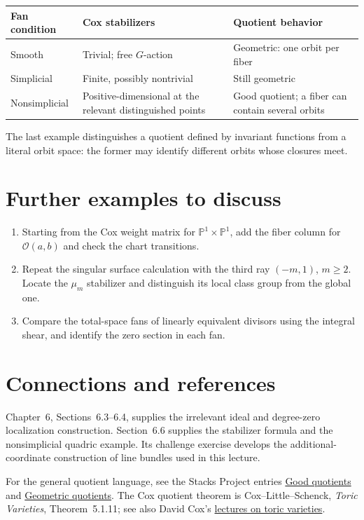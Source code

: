 \documentclass[11pt]{article}
\theoremstyle{definition}
\theoremstyle{remark}
\newcommand{\Pj}{\mathbb P}
\newcommand{\OO}{\mathcal O}
\begin{document}
\begin{center}
\small
\begin{tabularx}{\linewidth}{@{}lXX@{}}
\toprule
Fan condition & Cox stabilizers & Quotient behavior\\
\midrule
Smooth & Trivial; free \(G\)-action & Geometric: one orbit per fiber\\
Simplicial & Finite, possibly nontrivial & Still geometric\\
Nonsimplicial & Positive-dimensional at the relevant distinguished points
& Good quotient; a fiber can contain several orbits\\
\bottomrule
\end{tabularx}
\end{center}
The last example distinguishes a quotient defined by invariant
functions from a literal orbit space: the former may identify
different orbits whose closures meet.

\section*{Further examples to discuss}
\begin{enumerate}
\item Starting from the Cox weight matrix for \(\Pj^1\times\Pj^1\),
      add the fiber column for \(\OO(a,b)\) and check the chart transitions.
\item Repeat the singular surface calculation with the third ray
      \((-m,1)\), \(m\geq2\). Locate the \(\mu_m\) stabilizer and
      distinguish its local class group from the global one.
\item Compare the total-space fans of linearly equivalent divisors
      using the integral shear, and identify the zero section in each fan.
\end{enumerate}

\section*{Connections and references}
Chapter~6, Sections~6.3--6.4, supplies the irrelevant ideal and
degree-zero localization construction. Section~6.6 supplies the
stabilizer formula and the nonsimplicial quadric example. Its challenge
exercise develops the additional-coordinate construction of line
bundles used in this lecture.

For the general quotient language, see the Stacks Project entries
\href{https://stacks.math.columbia.edu/tag/04AB}{Good quotients}
and \href{https://stacks.math.columbia.edu/tag/04AD}{Geometric quotients}.
The Cox quotient theorem is Cox--Little--Schenck, \emph{Toric
Varieties}, Theorem~5.1.11; see also David Cox's
\href{https://dacox.people.amherst.edu/lectures/coxcimpa.pdf}{lectures on toric varieties}.
\end{document}
